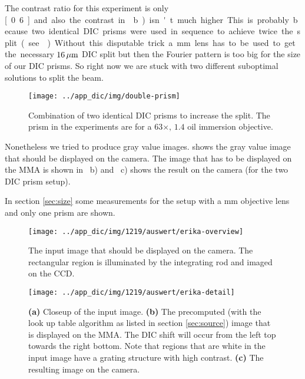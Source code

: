 The contrast ratio for this experiment is only \unit[0.6] and also the
contrast in ~b) isn't much higher. This is
probably because two identical DIC prisms were used in sequence to
achieve twice the split (see ). Without this
disputable trick a \unit[200]{mm} lens has to be used to get the
necessary $\unit[16]{\mu m}$ DIC split but then the Fourier pattern is
too big for the size of our DIC prisms. So right now we are stuck with
two different suboptimal solutions to split the beam.

\begin{figure}[htb]
  \centering
  \texttt{[image: ../app\_dic/img/double-prism]}
  \caption{Combination of two identical DIC prisms to increase the
    split. The prism in the experiments are for a $63\times,\,1.4$ oil
    immersion objective.}
  \label{fig:double-prism}
\end{figure}

Nonetheless we tried to produce gray value images.
 shows the gray value image that should be
displayed on the camera. The image that has to be displayed on the MMA
is shown in ~b) and
~c) shows the result on the camera (for the
two DIC prism setup).

In section \ref{sec:size} some measurements for the setup with a
\unit[200]{mm} objective lens and only one prism are shown.

\begin{figure}[p]
  \centering
  \texttt{[image: ../app\_dic/img/1219/auswert/erika-overview]}
  \caption{The input image that should be displayed on the camera. The
    rectangular region is illuminated by the integrating rod and
    imaged on the CCD.}
  \label{fig:erika-overview}
\end{figure}

\begin{figure}[p]
  \centering
  \texttt{[image: ../app\_dic/img/1219/auswert/erika-detail]}
  \caption{{\bf (a)} Closeup of the input image. {\bf (b)} The
    precomputed (with the look up table algorithm as listed in section
    \ref{sec:source}) image that is displayed on the MMA. The DIC
    shift will occur from the left top towards the right bottom. Note
    that regions that are white in the input image have a grating
    structure with high contrast. {\bf (c)} The resulting image on the
    camera.}
  \label{fig:erika-detail}
\end{figure}

